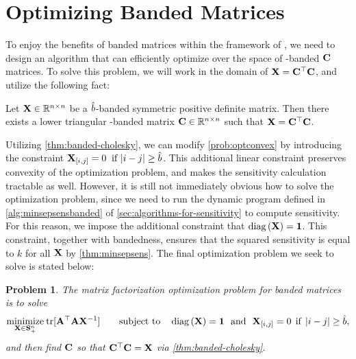 \documentclass{article}
\newtheorem{problem}{Problem}
\begin{document}
\section{Optimizing Banded Matrices}\label{sec:optimizing}
%
To enjoy the benefits of banded matrices within the framework of \MFFTRL, we need to design an algorithm that can efficiently optimize over the space of \bands-banded $\mathbf{C}$ matrices.  To solve this problem, we will work in the domain of $\mathbf{X} = \mathbf{C}^\top \mathbf{C}$, and utilize the following fact:
%
\begin{prop} \label{thm:banded-cholesky}
Let $\mathbf{X} \in \mathbb{R}^{n \times n}$ be a $\hat{b}$-banded symmetric positive definite matrix.  Then there exists a lower triangular \bands-banded matrix $\mathbf{C} \in \mathbb{R}^{n \times n}$ such that $\mathbf{X} = \mathbf{C}^\top \mathbf{C}$.
\end{prop}
%
Utilizing \cref{thm:banded-cholesky}, we can modify \cref{prob:optconvex} by introducing the constraint $\mathbf{X}_{[i,j]} = 0 \: \text{ if } | i - j | \geq \hat{b}$.  This additional linear constraint preserves convexity of the optimization problem, and makes the sensitivity calculation tractable as well.  However, it is still not immediately obvious how to solve the optimization problem, since we need to run the dynamic program defined in \cref{alg:minsepsensbanded} of \cref{sec:algorithms-for-sensitivity} to compute sensitivity.  For this reason, we impose the additional constraint that $ \operatorname{diag}{(\mathbf{X})} = \bf1$. This constraint, together with bandedness, ensures that the squared sensitivity is equal to $k$ for all $\mathbf{X}$ by \cref{thm:minsepsens}.  The final optimization problem we seek to solve is stated below:
%
%
\begin{problem}\label{prob:bandedopt}
The matrix factorization optimization problem for banded matrices is to solve 
\begin{equation} \label{eq:bandedopt}
\underset{\mathbf{X} \in \mathbf{S}^{n}_{+}}{\text{minimize}} \:
\mathrm{tr}[\mathbf{A}^\top \mathbf{A} \mathbf{X}^{-1}] 
\qquad
\text{subject to}
\quad
\operatorname{diag}{(\mathbf{X})} = \mathbf{1} 
\text{\ \ and\ \ }
 \mathbf{X}_{[i,j]} = 0 \:\:\text{if}\:\: | i - j | \geq \hat{b}, 
\end{equation}
and then find $\mathbf{C}$ so that $\mathbf{C}^\top \mathbf{C} = \mathbf{X}$ via \cref{thm:banded-cholesky}.
\end{problem}
\end{document}
